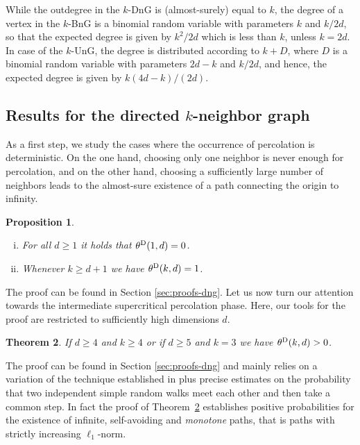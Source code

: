 \documentclass[a4paper, oneside, 11pt]{amsart}
\newtheorem{theorem}{Theorem}[section]
\newtheorem{prop}[theorem]{Proposition}
\theoremstyle{definition}
\newcommand{\1}{\mathbbm{1}}
\newcommand{\0}{\mathbf{o}}
\numberwithin{equation}{section}
\begin{document}
While the outdegree in the $k$-DnG is (almost-surely) equal to $k$,  the degree of a vertex in the $k$-BnG is a binomial random variable with parameters $k$ and $k/2d$, so that the expected degree is given by $k^2/2d$ which is less than $k$, unless $k=2d$. In case of the $k$-UnG, the degree is distributed according to $k+D$, where $D$ is a binomial random variable with parameters $2d-k$ and $k/2d$, and hence, the expected degree is given by $k(4d-k)/(2d)$.

\subsection{Results for the directed $k$-neighbor graph}
As a first step, we study the cases where the occurrence of percolation is deterministic. On the one hand, choosing only one neighbor is never enough for percolation, and on the other hand, choosing a sufficiently large number of neighbors leads to the almost-sure existence of a path connecting the origin to infinity. 

\begin{prop}\label{prop:deterministic-percolation-dng}
    \begin{enumerate}[(i)]
        \item For all $d \geq 1$ it holds that $\theta^{\rm D}(1,d) = 0$.
        \item Whenever $k \geq d+1$ we have $\theta^{\rm D}(k,d) = 1$. 
    \end{enumerate}
\end{prop}

The proof can be found in Section \ref{sec:proofs-dng}. Let us now turn our attention towards the intermediate supercritical percolation phase. Here, our tools for the proof are restricted to sufficiently high dimensions $d$.

\begin{theorem}\label{thm-CoxDurrett}
    If $d \geq 4$ and $k \geq 4$ or if $d \geq 5$ and $k = 3$ we have $\theta^{\rm D}(k,d)>0$.  
\end{theorem}
The proof can be found in  Section \ref{sec:proofs-dng} and mainly relies on a variation of the technique established in \cite{CoxDurrett} plus precise estimates on the probability that two independent simple random walks meet each other and then take a common step. In fact the proof of Theorem~\ref{thm-CoxDurrett} establishes positive probabilities for the existence of infinite, self-avoiding and {\em monotone} paths, that is paths with strictly increasing $\ell_1$-norm.
\end{document}
